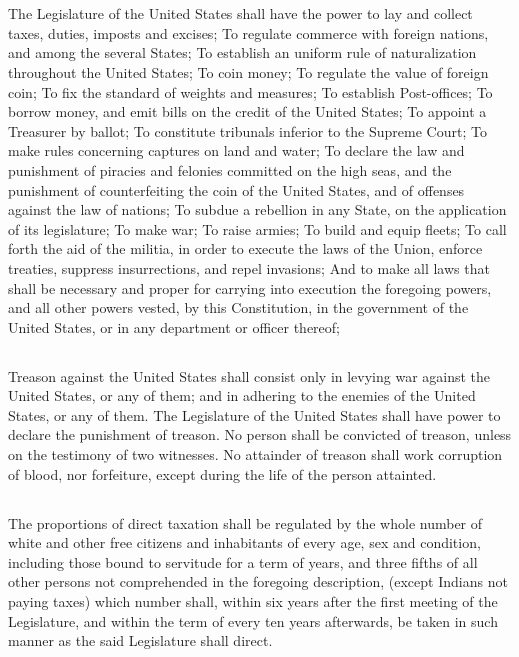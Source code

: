 \documentclass{constitution}
\begin{document}
\chapter{}
\section{}
The Legislature of the United States shall have the power to lay and collect taxes, duties, imposts and excises;
To regulate commerce with foreign nations, and among the several States;
To establish an uniform rule of naturalization throughout the United States;
To coin money;
To regulate the value of foreign coin;
To fix the standard of weights and measures;
To establish Post-offices;
To borrow money, and emit bills on the credit of the United States;
To appoint a Treasurer by ballot;
To constitute tribunals inferior to the Supreme Court;
To make rules concerning captures on land and water;
To declare the law and punishment of piracies and felonies committed on the high seas, and the punishment of counterfeiting the coin of the United States, and of offenses against the law of nations;
To subdue a rebellion in any State, on the application of its legislature;
To make war;
To raise armies;
To build and equip fleets;
To call forth the aid of the militia, in order to execute the laws of the Union, enforce treaties, suppress insurrections, and repel invasions;
And to make all laws that shall be necessary and proper for carrying into execution the foregoing powers, and all other powers vested, by this Constitution, in the government of the United States, or in any department or officer thereof;

\section{}
Treason against the United States shall consist only in levying war against the United States, or any of them;
and in adhering to the enemies of the United States, or any of them.
The Legislature of the United States shall have power to declare the punishment of treason.
No person shall be convicted of treason, unless on the testimony of two witnesses.
No attainder of treason shall work corruption of blood,
nor forfeiture, except during the life of the person attainted.

\section{}
The proportions of direct taxation shall be regulated by the whole number of white and other free citizens and inhabitants of every age, sex and condition,
including those bound to servitude for a term of years,
and three fifths of all other persons not comprehended in the foregoing description,
(except Indians not paying taxes)
which number shall, within six years after the first meeting of the Legislature,
and within the term of every ten years afterwards,
be taken in such manner as the said Legislature shall direct.
\end{document}
